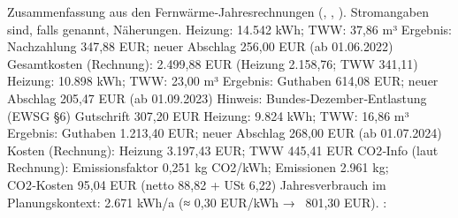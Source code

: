 \markdownRendererDocumentBegin
Zusammenfassung aus den Fernwärme‑Jahresrechnungen (, , ). Stromangaben sind, falls genannt, Näherungen.\markdownRendererInterblockSeparator
{}\markdownRendererSectionBegin
\markdownRendererSectionBegin
{}\markdownRendererInterblockSeparator
{}\markdownRendererUlBeginTight
{}\markdownRendererUlItemEnd 
\markdownRendererUlItem Heizung: 14.542 kWh; TWW: 37,86 m³\markdownRendererUlItemEnd 
\markdownRendererUlItem Ergebnis: Nachzahlung 347,88 EUR; neuer Abschlag 256,00 EUR (ab 01.06.2022)\markdownRendererUlItemEnd 
\markdownRendererUlItem Gesamtkosten (Rechnung): 2.499,88 EUR (Heizung 2.158,76; TWW 341,11)\markdownRendererUlItemEnd 
{}\markdownRendererUlItemEnd 
\markdownRendererUlItem Heizung: 10.898 kWh; TWW: 23,00 m³\markdownRendererUlItemEnd 
\markdownRendererUlItem Ergebnis: Guthaben 614,08 EUR; neuer Abschlag 205,47 EUR (ab 01.09.2023)\markdownRendererUlItemEnd 
\markdownRendererUlItem Hinweis: Bundes‑Dezember‑Entlastung (EWSG §6) Gutschrift 307,20 EUR\markdownRendererUlItemEnd 
{}\markdownRendererUlItemEnd 
\markdownRendererUlItem Heizung: 9.824 kWh; TWW: 16,86 m³\markdownRendererUlItemEnd 
\markdownRendererUlItem Ergebnis: Guthaben 1.213,40 EUR; neuer Abschlag 268,00 EUR (ab 01.07.2024)\markdownRendererUlItemEnd 
\markdownRendererUlItem Kosten (Rechnung): Heizung 3.197,43 EUR; TWW 445,41 EUR\markdownRendererUlItemEnd 
\markdownRendererUlItem CO2‑Info (laut Rechnung): Emissionsfaktor 0,251 kg CO2/kWh; Emissionen 2.961 kg; CO2‑Kosten 95,04 EUR (netto 88,82 + USt 6,22)\markdownRendererUlItemEnd 
\markdownRendererUlEndTight \markdownRendererInterblockSeparator
{}
\markdownRendererSectionEnd \markdownRendererSectionBegin
{}\markdownRendererInterblockSeparator
{}\markdownRendererUlBeginTight
\markdownRendererUlItem Jahresverbrauch im Planungskontext: 2.671 kWh/a (≈ 0,30 EUR/kWh → ~801,30 EUR).\markdownRendererUlItemEnd 
\markdownRendererUlEndTight \markdownRendererInterblockSeparator
{}
\markdownRendererSectionEnd \markdownRendererSectionBegin
{}\markdownRendererInterblockSeparator
{}\markdownRendererUlBeginTight
{}: \markdownRendererUlItemEnd 
